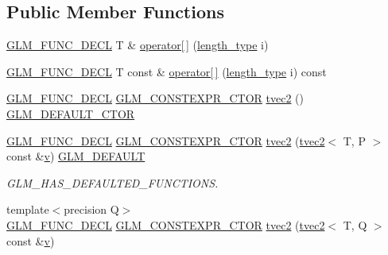 \subsection*{Public Member Functions}
\begin{DoxyCompactItemize}
\item 
\mbox{\hyperlink{setup_8hpp_ab2d052de21a70539923e9bcbf6e83a51}{G\+L\+M\+\_\+\+F\+U\+N\+C\+\_\+\+D\+E\+CL}} T \& \mbox{\hyperlink{structglm_1_1tvec2_a70383ca2702ecf4d4ff41063de68594d}{operator\mbox{[}$\,$\mbox{]}}} (\mbox{\hyperlink{structglm_1_1tvec2_a5a5ddebab821a3cf9185772386afbe8d}{length\+\_\+type}} i)
\item 
\mbox{\hyperlink{setup_8hpp_ab2d052de21a70539923e9bcbf6e83a51}{G\+L\+M\+\_\+\+F\+U\+N\+C\+\_\+\+D\+E\+CL}} T const  \& \mbox{\hyperlink{structglm_1_1tvec2_ac33b4e2caff661fba68f07e19a7d499f}{operator\mbox{[}$\,$\mbox{]}}} (\mbox{\hyperlink{structglm_1_1tvec2_a5a5ddebab821a3cf9185772386afbe8d}{length\+\_\+type}} i) const
\item 
\mbox{\hyperlink{setup_8hpp_ab2d052de21a70539923e9bcbf6e83a51}{G\+L\+M\+\_\+\+F\+U\+N\+C\+\_\+\+D\+E\+CL}} \mbox{\hyperlink{setup_8hpp_ad34178a09666081abdb573c14d1f4a5a}{G\+L\+M\+\_\+\+C\+O\+N\+S\+T\+E\+X\+P\+R\+\_\+\+C\+T\+OR}} \mbox{\hyperlink{structglm_1_1tvec2_ab05030327b4fa4ddc35e3c905f8e4f7f}{tvec2}} () \mbox{\hyperlink{setup_8hpp_afb97a4e995bc004c0cbbfa22125b80ba}{G\+L\+M\+\_\+\+D\+E\+F\+A\+U\+L\+T\+\_\+\+C\+T\+OR}}
\item 
\mbox{\hyperlink{setup_8hpp_ab2d052de21a70539923e9bcbf6e83a51}{G\+L\+M\+\_\+\+F\+U\+N\+C\+\_\+\+D\+E\+CL}} \mbox{\hyperlink{setup_8hpp_ad34178a09666081abdb573c14d1f4a5a}{G\+L\+M\+\_\+\+C\+O\+N\+S\+T\+E\+X\+P\+R\+\_\+\+C\+T\+OR}} \mbox{\hyperlink{structglm_1_1tvec2_a3c688d3927a3e5e9f30039ce50387727}{tvec2}} (\mbox{\hyperlink{structglm_1_1tvec2}{tvec2}}$<$ T, P $>$ const \&\mbox{\hyperlink{glad_8h_a14cfbe2fc2234f5504618905b69d1e06}{v}}) \mbox{\hyperlink{setup_8hpp_aefce7051c376a64ba89fa93a9f63bc2c}{G\+L\+M\+\_\+\+D\+E\+F\+A\+U\+LT}}
\begin{DoxyCompactList}\small\item\em G\+L\+M\+\_\+\+H\+A\+S\+\_\+\+D\+E\+F\+A\+U\+L\+T\+E\+D\+\_\+\+F\+U\+N\+C\+T\+I\+O\+NS. \end{DoxyCompactList}\item 
{\footnotesize template$<$precision Q$>$ }\\\mbox{\hyperlink{setup_8hpp_ab2d052de21a70539923e9bcbf6e83a51}{G\+L\+M\+\_\+\+F\+U\+N\+C\+\_\+\+D\+E\+CL}} \mbox{\hyperlink{setup_8hpp_ad34178a09666081abdb573c14d1f4a5a}{G\+L\+M\+\_\+\+C\+O\+N\+S\+T\+E\+X\+P\+R\+\_\+\+C\+T\+OR}} \mbox{\hyperlink{structglm_1_1tvec2_ab5d63947a357697675db31c4a31aebc7}{tvec2}} (\mbox{\hyperlink{structglm_1_1tvec2}{tvec2}}$<$ T, Q $>$ const \&\mbox{\hyperlink{glad_8h_a14cfbe2fc2234f5504618905b69d1e06}{v}})

\end{DoxyCompactItemize}
